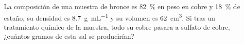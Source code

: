 La composición de una muestra de bronce es \SI{82}{\percent} en peso en cobre y \SI{18}{\percent} de estaño, su densidad es \SI{8,7}{\gram\per\milli\liter} y su volumen es \SI{62}{\cubic\centi\meter}. Si tras un tratamiento químico de la muestra, todo su cobre pasara a sulfato de cobre, ¿cuántos gramos de esta sal se producirían?

